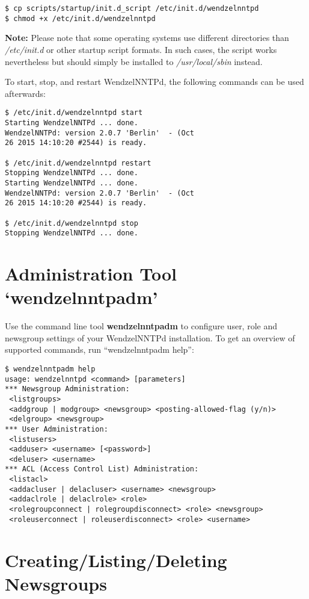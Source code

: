\begin{verbatim}
$ cp scripts/startup/init.d_script /etc/init.d/wendzelnntpd
$ chmod +x /etc/init.d/wendzelnntpd
\end{verbatim}

\textbf{Note:} Please note that some operating systems use different directories than \textit{/etc/init.d} or other startup script formats. In such cases, the script works nevertheless but should simply be installed to \textit{/usr/local/sbin} instead.


To start, stop, and restart WendzelNNTPd, the following commands can be used afterwards:

\begin{verbatim}
$ /etc/init.d/wendzelnntpd start
Starting WendzelNNTPd ... done.
WendzelNNTPd: version 2.0.7 'Berlin'  - (Oct
26 2015 14:10:20 #2544) is ready.

$ /etc/init.d/wendzelnntpd restart
Stopping WendzelNNTPd ... done.
Starting WendzelNNTPd ... done.
WendzelNNTPd: version 2.0.7 'Berlin'  - (Oct
26 2015 14:10:20 #2544) is ready.

$ /etc/init.d/wendzelnntpd stop
Stopping WendzelNNTPd ... done.
\end{verbatim}



\section{Administration Tool `wendzelnntpadm'}

Use the command line tool \textbf{wendzelnntpadm} to configure user, role and newsgroup settings of your WendzelNNTPd installation. To get an overview of supported commands, run ``wendzelnntpadm help'':

\begin{verbatim}
$ wendzelnntpadm help
usage: wendzelnntpd <command> [parameters]
*** Newsgroup Administration:
 <listgroups>
 <addgroup | modgroup> <newsgroup> <posting-allowed-flag (y/n)>
 <delgroup> <newsgroup>
*** User Administration:
 <listusers>
 <adduser> <username> [<password>]
 <deluser> <username>
*** ACL (Access Control List) Administration:
 <listacl>
 <addacluser | delacluser> <username> <newsgroup>
 <addaclrole | delaclrole> <role>
 <rolegroupconnect | rolegroupdisconnect> <role> <newsgroup>
 <roleuserconnect | roleuserdisconnect> <role> <username>
\end{verbatim}

\section{Creating/Listing/Deleting Newsgroups}

